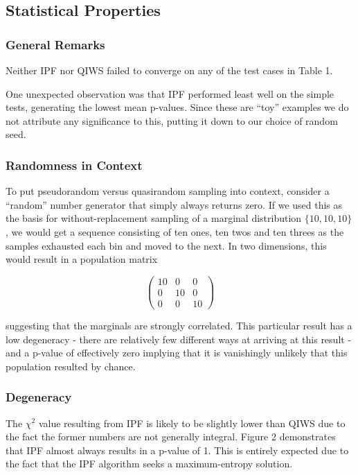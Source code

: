 \documentclass[]{article}
\begin{document}
\subsection{Statistical Properties}\label{statistical-properties-1}

\subsubsection{General Remarks}\label{general-remarks}

Neither IPF nor QIWS failed to converge on any of the test cases in
Table 1.

One unexpected observation was that IPF performed least well on the
simple tests, generating the lowest mean p-values. Since these are
``toy'' examples we do not attribute any significance to this, putting
it down to our choice of random seed.

\subsubsection{Randomness in Context}\label{randomness-in-context}

To put pseudorandom versus quasirandom sampling into context, consider a
``random'' number generator that simply always returns zero. If we used
this as the basis for without-replacement sampling of a marginal
distribution \(\lbrace10,10,10\rbrace\), we would get a sequence
consisting of ten ones, ten twos and ten threes as the samples exhausted
each bin and moved to the next. In two dimensions, this would result in
a population matrix

\[\left( \begin{array}{ccc}
10 & 0 & 0 \\
0 & 10 & 0 \\
0 & 0 & 10 \end{array} \right)\]

suggesting that the marginals are strongly correlated. This particular
result has a low degeneracy - there are relatively few different ways at
arriving at this result - and a p-value of effectively zero implying
that it is vanishingly unlikely that this population resulted by chance.

\subsubsection{Degeneracy}\label{degeneracy}

The \(\chi^2\) value resulting from IPF is likely to be slightly lower
than QIWS due to the fact the former numbers are not generally integral.
Figure 2 demonstrates that IPF almost always results in a p-value of 1.
This is entirely expected due to the fact that the IPF algorithm seeks a 
maximum-entropy solution.
\end{document}
